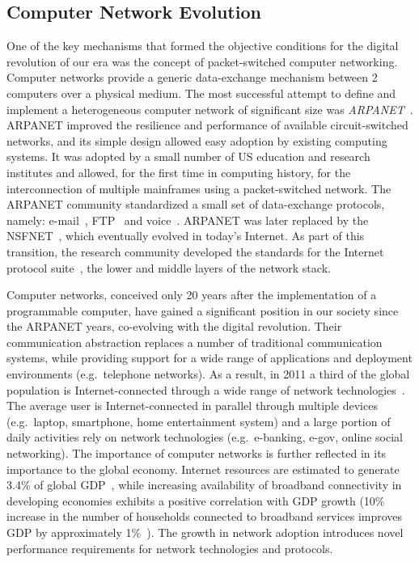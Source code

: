 \subsection{Computer Network Evolution}\label{sec:intro:net_evolution}

One of the key mechanisms that formed the objective conditions for the digital
revolution of our era was the concept of packet-switched computer networking.
Computer networks provide a generic data-exchange mechanism between 2 computers
over a physical medium.  The most successful attempt to define and implement a
heterogeneous computer network of significant size was
\textit{ARPANET}~. ARPANET improved the resilience and
performance of available circuit-switched networks, and its simple design
allowed easy adoption by existing computing systems.  It was adopted by a small
number of US education and research institutes and allowed, for the first time
in computing history, for the interconnection of multiple mainframes using a
packet-switched network. The ARPANET community standardized a small set of
data-exchange protocols, namely: e-mail~, FTP~
and voice~. ARPANET was later replaced by the
NSFNET~, which eventually evolved in today's Internet.  As
part of this transition, the research community developed the standards for the
Internet protocol suite~, the
lower and middle layers of the network stack.

Computer networks, conceived only 20 years after the implementation of a
programmable computer, have gained a significant position in our society since
the ARPANET years, co-evolving with the digital revolution.  Their
communication abstraction replaces a number of traditional communication
systems, while providing support for a wide range of applications and
deployment environments (e.g.~telephone networks).  As a result, in 2011 a
third of the global population is Internet-connected through a wide range of
network technologies~.  The average user is
Internet-connected in parallel through multiple devices (e.g.~laptop,
smartphone, home entertainment system) and a large portion of daily activities
rely on network technologies (e.g.~e-banking, e-gov, online social networking).
The importance of computer networks is further reflected in its importance to
the global economy. Internet resources are estimated to generate 3.4\% of
global GDP~, while increasing availability of broadband
connectivity in developing economies exhibits a positive correlation with GDP
growth (10\% increase in the number of households connected to broadband
services improves GDP by approximately 1\%~).  The growth in
network adoption introduces novel performance requirements for network
technologies and protocols.  

